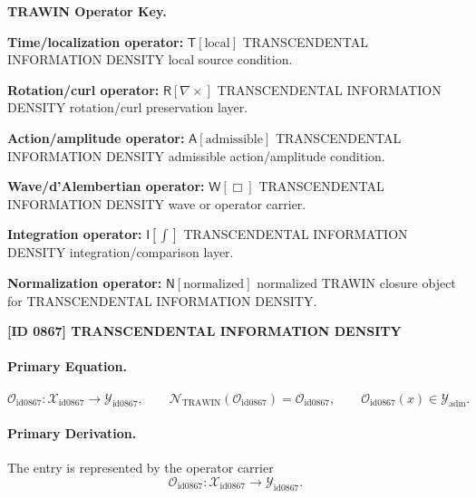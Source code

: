 \par\vspace{0.45\baselineskip}
\noindent\begin{minipage}[t]{\linewidth}
\begingroup
\small
\raggedright
\textbf{TRAWIN Operator Key.}\par
\noindent\textbf{Time/localization operator:} $\mathsf{T}\!\left[\mathrm{local}\right]$ TRANSCENDENTAL INFORMATION DENSITY local source condition.\par
\noindent\textbf{Rotation/curl operator:} $\mathsf{R}\!\left[\nabla\times\right]$ TRANSCENDENTAL INFORMATION DENSITY rotation/curl preservation layer.\par
\noindent\textbf{Action/amplitude operator:} $\mathsf{A}\!\left[\mathrm{admissible}\right]$ TRANSCENDENTAL INFORMATION DENSITY admissible action/amplitude condition.\par
\noindent\textbf{Wave/d'Alembertian operator:} $\mathsf{W}\!\left[\Box\right]$ TRANSCENDENTAL INFORMATION DENSITY wave or operator carrier.\par
\noindent\textbf{Integration operator:} $\mathsf{I}\!\left[\int\right]$ TRANSCENDENTAL INFORMATION DENSITY integration/comparison layer.\par
\noindent\textbf{Normalization operator:} $\mathsf{N}\!\left[\mathrm{normalized}\right]$ normalized TRAWIN closure object for TRANSCENDENTAL INFORMATION DENSITY.\par
\endgroup
\end{minipage}

\clearpage
\noindent\textbf{[ID 0867] TRANSCENDENTAL INFORMATION DENSITY}\par
\vspace{0.35em}
\paragraph{Primary Equation.}
\[
\mathcal{O}_{\mathrm{id0867}}:\mathcal{X}_{\mathrm{id0867}}\longrightarrow \mathcal{Y}_{\mathrm{id0867}},\qquad
\mathcal{N}_{\mathrm{TRAWIN}}(\mathcal{O}_{\mathrm{id0867}})=\mathcal{O}_{\mathrm{id0867}},\qquad
\mathcal{O}_{\mathrm{id0867}}(x)\in\mathcal{Y}_{\mathrm{adm}}.
\]

\paragraph{Primary Derivation.} The entry is represented by the operator carrier\[
\mathcal{O}_{\mathrm{id0867}}:\mathcal{X}_{\mathrm{id0867}}\longrightarrow \mathcal{Y}_{\mathrm{id0867}}.
\]

